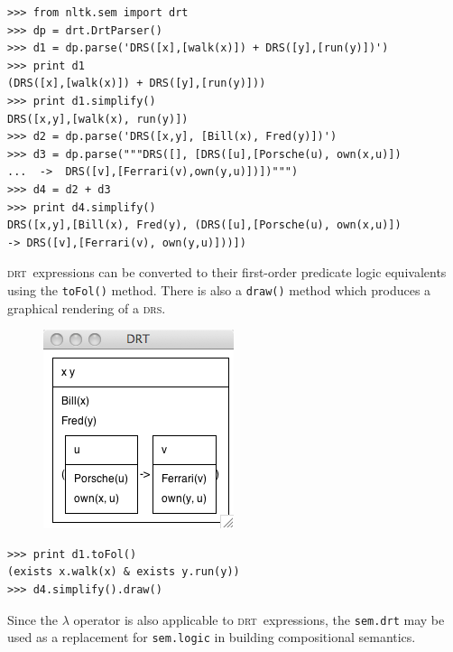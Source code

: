 \documentclass[11pt,a4paper]{article}
\newcommand{\DRS}{\textsc{drs}}
\newcommand{\DRT}{\textsc{drt}}
\newcommand{\NLTK}{\textsc{nltk}}
\newcommand{\dhgcode}[1]{{\tt #1}}
\begin{document}
\begin{verbatim}
>>> from nltk.sem import drt
>>> dp = drt.DrtParser()
>>> d1 = dp.parse('DRS([x],[walk(x)]) + DRS([y],[run(y)])')
>>> print d1
(DRS([x],[walk(x)]) + DRS([y],[run(y)]))
>>> print d1.simplify()
DRS([x,y],[walk(x), run(y)])
>>> d2 = dp.parse('DRS([x,y], [Bill(x), Fred(y)])')
>>> d3 = dp.parse("""DRS([], [DRS([u],[Porsche(u), own(x,u)])
...  ->  DRS([v],[Ferrari(v),own(y,u)])])""")
>>> d4 = d2 + d3
>>> print d4.simplify()
DRS([x,y],[Bill(x), Fred(y), (DRS([u],[Porsche(u), own(x,u)]) 
-> DRS([v],[Ferrari(v), own(y,u)]))])
\end{verbatim}

\noindent
\DRT\ expressions can be converted to their first-order predicate
logic equivalents using the \dhgcode{toFol()} method. There is also a
\texttt{draw()} method which produces a graphical rendering of a \DRS.
\hfill\\
\begin{figure}
\includegraphics[scale=.5]{drs.png}
\end{figure}

\begin{verbatim}
>>> print d1.toFol()
(exists x.walk(x) & exists y.run(y))
>>> d4.simplify().draw()
\end{verbatim}


Since the $\lambda$ operator is also applicable to \DRT\ expressions,
the \dhgcode{sem.drt} may be used as a replacement for
\dhgcode{sem.logic} in building compositional semantics.

\clearpage

\end{document}
